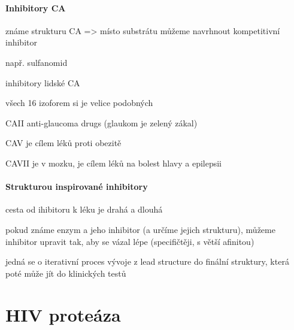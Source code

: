 \documentclass[DIV=8]{scrreprt}
\begin{document}
\paragraph{Inhibitory CA}
\begin{myItemize}[nosep]
    \item známe strukturu CA => místo substrátu můžeme navrhnout kompetitivní inhibitor
\begin{myItemize}[nosep]
    \item např. sulfanomid
\end{myItemize}

    \item inhibitory lidské CA
\begin{myItemize}[nosep]
    \item všech 16 izoforem si je velice podobných
    \item CAII anti-glaucoma drugs (glaukom je zelený zákal)
    \item CAV je cílem léků proti obezitě
    \item CAVII je v mozku, je cílem léků na bolest hlavy a epilepsii
\end{myItemize}

\end{myItemize}



\paragraph{Strukturou inspirované inhibitory}
\begin{myItemize}[nosep]
    \item cesta od ihibitoru k léku je drahá a dlouhá
    \item pokud známe enzym a jeho inhibitor (a určíme jejich strukturu), můžeme inhibitor upravit tak, aby se vázal lépe (specifičtěji, s větší afinitou)
\begin{myItemize}[nosep]
    \item jedná se o iterativní proces vývoje z lead structure do finální struktury, která poté může jít do klinických testů
\end{myItemize}

\end{myItemize}



\section{HIV proteáza} \label{HIV proteáza} \FloatBarrier
\end{document}
